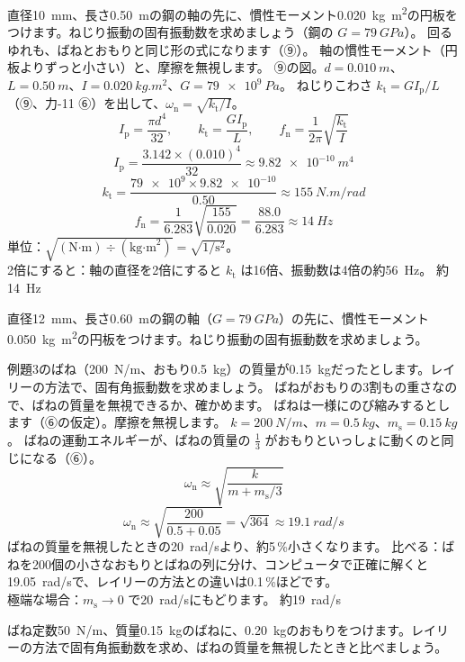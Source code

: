 \label{ph:波-1:ex11}
\begin{phreidai}[鋼の軸と円板のねじり振動]
直径\qty{10}{mm}、長さ\qty{0.50}{m}の鋼の軸の先に、慣性モーメント\qty{0.020}{kg.m^2}の円板をつけます。ねじり振動の固有振動数を求めましょう（鋼の $G=\qty{79}{GPa}$）。
\phbamen
回るゆれも、ばねとおもりと同じ形の式になります（⑨）。
\phmushi
軸の慣性モーメント（円板よりずっと小さい）と、摩擦を無視します。
\phzu
⑨の図。$d=\qty{0.010}{m}$、$L=\qty{0.50}{m}$、$I=\qty{0.020}{kg.m^2}$、$G=\qty{79e9}{Pa}$。
\phriyu
ねじりこわさ $k_{\mathrm t}=GI_{\mathrm p}/L$（⑨、力-11 ⑥）を出して、$\omega_{\mathrm n}=\sqrt{k_{\mathrm t}/I}$。
\phtateru
\[I_{\mathrm p}=\frac{\pi d^4}{32},\qquad k_{\mathrm t}=\frac{GI_{\mathrm p}}{L},\qquad f_{\mathrm n}=\frac{1}{2\pi}\sqrt{\frac{k_{\mathrm t}}{I}}\]
\phtoku
\[I_{\mathrm p}=\frac{3.142\times(0.010)^4}{32}\approx\qty{9.82e-10}{m^4}\]
\[k_{\mathrm t}=\frac{\num{79e9}\times\num{9.82e-10}}{0.50}\approx\qty{155}{N.m/rad}\]
\[f_{\mathrm n}=\frac{1}{6.283}\sqrt{\frac{155}{0.020}}=\frac{88.0}{6.283}\approx\qty{14}{Hz}\]
\phtashikame
単位：$\sqrt{(\text{N·m})\div(\text{kg·m}^2)}=\sqrt{1/\text{s}^2}$。\\
2倍にすると：軸の直径を2倍にすると $k_{\mathrm t}$ は16倍、振動数は4倍の約\qty{56}{Hz}。
\kotae 約\qty{14}{Hz}
\end{phreidai}
\begin{jibun}
直径\qty{12}{mm}、長さ\qty{0.60}{m}の鋼の軸（$G=\qty{79}{GPa}$）の先に、慣性モーメント\qty{0.050}{kg.m^2}の円板をつけます。ねじり振動の固有振動数を求めましょう。
\end{jibun}

\label{ph:波-1:ex12}
\begin{phreidai}[ばねの質量を入れると]
例題3のばね（\qty{200}{N/m}、おもり\qty{0.5}{kg}）の質量が\qty{0.15}{kg}だったとします。レイリーの方法で、固有角振動数を求めましょう。
\phbamen
ばねがおもりの3割もの重さなので、ばねの質量を無視できるか、確かめます。
\phmushi
ばねは一様にのび縮みするとします（⑥の仮定）。摩擦を無視します。
\phzu
$k=\qty{200}{N/m}$、$m=\qty{0.5}{kg}$、$m_{\mathrm s}=\qty{0.15}{kg}$。
\phriyu
ばねの運動エネルギーが、ばねの質量の $\tfrac{1}{3}$ がおもりといっしょに動くのと同じになる（⑥）。
\phtateru
\[\omega_{\mathrm n}\approx\sqrt{\frac{k}{m+m_{\mathrm s}/3}}\]
\phtoku
\[\omega_{\mathrm n}\approx\sqrt{\frac{200}{0.5+0.05}}=\sqrt{364}\approx\qty{19.1}{rad/s}\]
ばねの質量を無視したときの\qty{20}{rad/s}より、約5\,\%小さくなります。
\phtashikame
比べる：ばねを200個の小さなおもりとばねの列に分け、コンピュータで正確に解くと\qty{19.05}{rad/s}で、レイリーの方法との違いは0.1\,\%ほどです。\\
極端な場合：$m_{\mathrm s}\to0$ で\qty{20}{rad/s}にもどります。
\kotae 約\qty{19}{rad/s}
\end{phreidai}
\begin{jibun}
ばね定数\qty{50}{N/m}、質量\qty{0.15}{kg}のばねに、\qty{0.20}{kg}のおもりをつけます。レイリーの方法で固有角振動数を求め、ばねの質量を無視したときと比べましょう。
\end{jibun}

